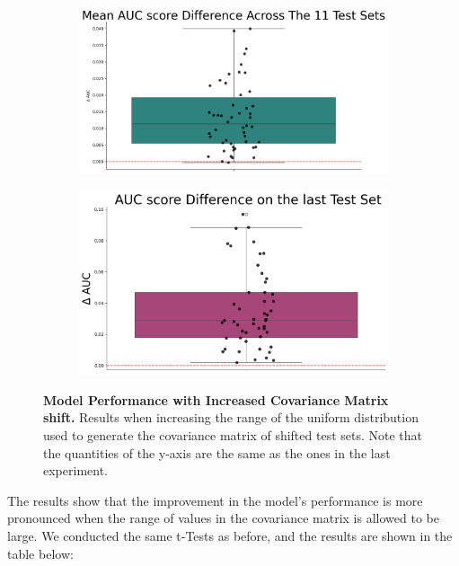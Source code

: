 \begin{figure}[H]
\begin{subfigure}{0.45\textwidth}
    \end{subfigure}
    \begin{subfigure}{0.45\textwidth}
        \centering
        \includegraphics[width=\linewidth]{assets/3_075.png}
        
    \end{subfigure}
    \begin{subfigure}{0.45\textwidth}
        \centering
        \includegraphics[width=\linewidth]{assets/4_075.png}
        
    \end{subfigure}
    \caption{\textbf{Model Performance with Increased Covariance Matrix shift.} Results when increasing the range of the uniform distribution used to generate the covariance matrix of shifted test sets. Note that the quantities of the y-axis are the same as the ones in the last experiment.}
\end{figure}


The results show that the improvement in the model's performance is more pronounced when the range of values in the covariance matrix is allowed to be large.
We conducted the same t-Tests as before, and the results are shown in the table below:

